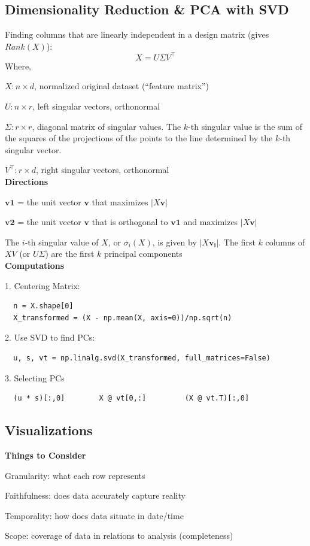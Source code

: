 \documentclass[8pt]{extarticle}
\begin{document}
\subsection*{Dimensionality Reduction \& PCA with SVD}
Finding columns that are linearly independent in a design matrix (gives $Rank(X)$):
$$ X = U\Sigma V^\top $$
Where,

$X: n\times d$, normalized original dataset (“feature matrix”)\par
$U: n\times r$, left singular vectors, orthonormal\par
$\Sigma: r\times r$, diagonal matrix of singular values. The $k$-th singular value is the sum of the squares of the projections of the points to the line determined by the $k$-th singular vector.\par
$V^\top: r\times d$, right singular vectors, orthonormal\\

\textbf{Directions}

$\mathbf{v1}$ = the unit vector $\mathbf{v}$ that maximizes $|X\mathbf{v}|$\par
$\mathbf{v2}$ = the unit vector $\mathbf{v}$ that is orthogonal to $\mathbf{v1}$ and maximizes $|X\mathbf{v}|$\par
The $i$-th singular value of $X$, or $\sigma_i(X)$, is given by $|X\mathbf{v_i}|$. The first $k$ columns of $XV$ (or $UΣ$) are the first $k$ principal components\\

\textbf{Computations}

1. Centering Matrix:
\begin{verbatim}
  n = X.shape[0]
  X_transformed = (X - np.mean(X, axis=0))/np.sqrt(n)
\end{verbatim}

2. Use SVD to find PCs:
\begin{verbatim}
  u, s, vt = np.linalg.svd(X_transformed, full_matrices=False)
\end{verbatim}

3. Selecting PCs
\begin{verbatim}
  (u * s)[:,0]        X @ vt[0,:]         (X @ vt.T)[:,0]
\end{verbatim}
\hline

\subsection*{Visualizations}
\textbf{Things to Consider}

Granularity: what each row represents\par
Faithfulness: does data accurately capture reality\par
Temporality: how does data situate in date/time\par
Scope: coverage of data in relations to analysis (completeness) \\
\end{document}
